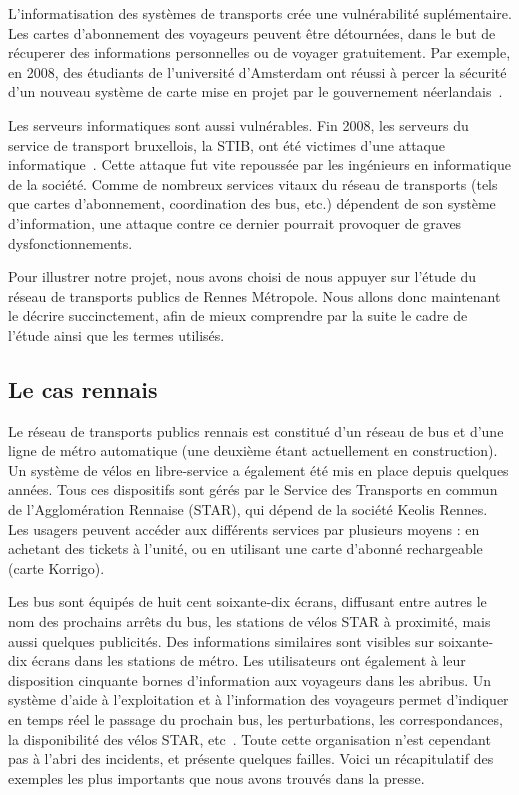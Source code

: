     	L'informatisation des systèmes de transports crée une vulnérabilité suplémentaire. Les cartes d'abonnement des voyageurs peuvent être détournées, dans le but de récuperer des informations personnelles ou de voyager gratuitement. Par exemple, en 2008, des étudiants de l'université d'Amsterdam ont réussi à percer la sécurité d'un nouveau système de carte mise en projet par le gouvernement néerlandais~\cite{Amst_RFID}. 
    	
    	Les serveurs informatiques sont aussi vulnérables. Fin 2008, les serveurs du service de transport bruxellois, la STIB, ont été victimes d'une attaque informatique~\cite{STIB}. Cette attaque fut vite repoussée par les ingénieurs en informatique de la société. Comme de nombreux services vitaux du réseau de transports (tels que cartes d'abonnement, coordination des bus, etc.) dépendent de son système d'information, une attaque contre ce dernier pourrait provoquer de graves dysfonctionnements.

    	Pour illustrer notre projet, nous avons choisi de nous appuyer sur l'étude du réseau de transports publics de Rennes Métropole. Nous allons donc maintenant le décrire succinctement, afin de mieux comprendre par la suite le cadre de l'étude ainsi que les termes utilisés.
                
    \subsection{Le cas rennais}
    	Le réseau de transports publics rennais est constitué d'un réseau de bus et d'une ligne de métro automatique (une deuxième étant actuellement en construction). Un système de vélos en libre-service a également été mis en place depuis quelques années. Tous ces dispositifs sont gérés par le Service des Transports en commun de l'Agglomération Rennaise (STAR), qui dépend de la société Keolis Rennes. Les usagers peuvent accéder aux différents services par plusieurs moyens : en achetant des tickets à l'unité, ou en utilisant une carte d'abonné rechargeable (carte Korrigo). 

        Les bus sont équipés de huit cent soixante-dix écrans, diffusant entre autres le nom des prochains arrêts du bus, les stations de vélos STAR à proximité, mais aussi quelques publicités. Des informations similaires sont visibles sur soixante-dix écrans dans les stations de métro. Les utilisateurs ont également à leur disposition cinquante bornes d’information aux voyageurs dans les abribus. Un système d’aide à l’exploitation et à l’information des voyageurs permet d’indiquer en temps réel le passage du prochain bus, les perturbations, les correspondances, la disponibilité des vélos STAR, etc~\cite{chiffres_star}. Toute cette organisation n'est cependant pas à l'abri des incidents, et présente quelques failles. Voici un récapitulatif des exemples les plus importants que nous avons trouvés dans la presse.
        
